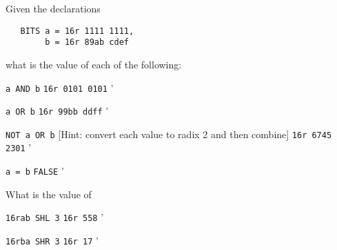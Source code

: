 \begin{exercise}
\item Given the declarations
\begin{verbatim}
   BITS a = 16r 1111 1111,
        b = 16r 89ab cdef
\end{verbatim}
\noindent
what is the value of each of the following:
\begin{subex}
\item \verb|a AND b| \subans \verb|16r 0101 0101|
'
\item \verb|a OR b| \subans \verb|16r 99bb ddff|
'
\item \verb|NOT a OR b| [Hint: convert each value to radix 2 and then
combine] \subans \verb|16r 6745 2301|
'
\item \verb|a = b| \subans \verb|FALSE|
'
\end{subex}
\item What is the value of
\begin{subex}
\item \verb|16rab SHL 3| \subans \verb|16r 558|
'
\item \verb|16rba SHR 3| \subans \verb|16r 17|
'
\end{subex}
\end{exercise}

